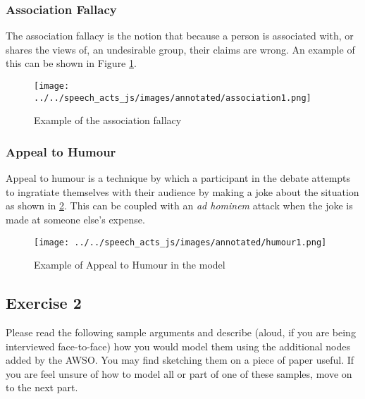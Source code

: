 \subsubsection{Association Fallacy}
The association fallacy is the notion that because a person is associated with, or shares the views of, an undesirable group, their claims are wrong. An example of this can be shown in Figure \ref{figure:app_association1}.

\begin{figure}[H]
\centering
\texttt{[image: ../../speech\_acts\_js/images/annotated/association1.png]}
\caption{Example of the association fallacy}
\label{figure:app_association1}
\end{figure}

\subsubsection{Appeal to Humour}
Appeal to humour is a technique by which a participant in the debate attempts to ingratiate themselves with their audience by making a joke about the situation as shown in \ref{figure:app_humour1}. This can be coupled with an \textit{ad hominem} attack when the joke is made at someone else's expense.%
\begin{figure}[H]
\centering
\texttt{[image: ../../speech\_acts\_js/images/annotated/humour1.png]}
\caption{Example of Appeal to Humour in the model}
\label{figure:app_humour1}
\end{figure}

\subsection{Exercise 2}
Please read the following sample arguments and describe (aloud, if you are being interviewed face-to-face) how you would model them using the additional nodes added by the AWSO. You may find sketching them on a piece of paper useful. If you are feel unsure of how to model all or part of one of these samples, move on to the next part.

